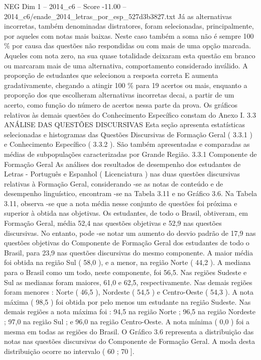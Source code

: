 \begin{textsample}{NEG Dim 1 – 2014\_c6 – Score -11.00 – 2014\_c6/enade\_2014\_letras\_por\_esp\_527d3b3827.txt}
Já as alternativas incorretas, também denominadas distratores, foram selecionadas, principalmente, por aqueles com notas mais baixas.
Neste caso também a soma não é sempre 100 \% por causa das questões não respondidas ou com mais de uma opção marcada.
Aqueles com nota zero, na sua quase totalidade deixaram esta questão em branco ou marcaram mais de uma alternativa, comportamento considerado inválido.
A proporção de estudantes que selecionou a resposta correta E aumenta gradativamente, chegando a atingir 100 \% para 19 acertos ou mais, enquanto a proporção dos que escolheram alternativas incorretas decai, a partir de um acerto, como função do número de acertos nessa parte da prova.
Os gráficos relativos às demais questões do Conhecimento Específico constam do Anexo I. 3.3 ANÁLISE DAS QUESTÕES DISCURSIVAS Esta seção apresenta estatísticas selecionadas e histogramas das Questões Discursivas de Formação Geral ( 3.3.1 ) e Conhecimento Específico ( 3.3.2 ).
São também apresentadas e comparadas as médias de subpopulações caracterizadas por Grande Região. 3.3.1 Componente de Formação Geral As análises dos resultados de desempenho dos estudantes de Letras - Português e Espanhol ( Licenciatura ) nas duas questões discursivas relativas à Formação Geral, considerando -se as notas de conteúdo e de desempenho linguístico, encontram -se na Tabela 3.11 e no Gráfico 3.6.
Na Tabela 3.11, observa -se que a nota média nesse conjunto de questões foi próxima e superior à obtida nas objetivas.
Os estudantes, de todo o Brasil, obtiveram, em Formação Geral, média 52,4 nas questões objetivas e 52,9 nas questões discursivas.
No entanto, pode -se notar um aumento do desvio padrão de 17,9 nas questões objetivas do Componente de Formação Geral dos estudantes de todo o Brasil, para 23,9 nas questões discursivas do mesmo componente.
A maior média foi obtida na região Sul ( 58,0 ), e a menor, na região Norte ( 44,2 ).
A mediana para o Brasil como um todo, neste componente, foi 56,5.
Nas regiões Sudeste e Sul as medianas foram maiores, 61,0 e 62,5, respectivamente.
Nas demais regiões foram menores : Norte ( 46,5 ), Nordeste ( 54,5 ) e Centro-Oeste ( 54,3 ).
A nota máxima ( 98,5 ) foi obtida por pelo menos um estudante na região Sudeste.
Nas demais regiões a nota máxima foi : 94,5 na região Norte ; 96,5 na região Nordeste ; 97,0 na região Sul ; e 96,0 na região Centro-Oeste.
A nota mínima ( 0,0 ) foi a mesma em todas as regiões do Brasil.
O Gráfico 3.6 representa a distribuição das notas nas questões discursivas do Componente de Formação Geral.
A moda desta distribuição ocorre no intervalo ( 60 ; 70 ].

\end{textsample}

